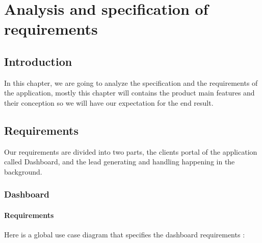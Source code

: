 \chapter{Analysis and specification of requirements}
\newpage

\setcounter{secnumdepth}{0} %
\section{Introduction}
In this chapter, we are going to analyze the specification and the requirements of the application, mostly this chapter will contains the product main features and their conception so we will have our expectation for the end result.
\setcounter{secnumdepth}{3} %

\section{Requirements}
Our requirements are divided into two parts, the clients portal of the application called Dashboard, and the lead generating and handling happening in the background.
\subsection{Dashboard}
\subsubsection{Requirements}
Here is a global use case diagram that specifies the dashboard requirements :
